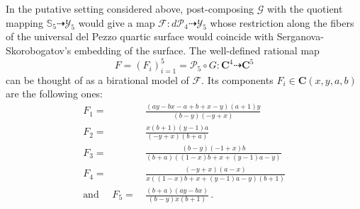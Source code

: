 \documentclass[11pt]{amsart}
\begin{document}
In the putative setting considered above, post-composing %
 $\mathcal G$ with the quotient mapping $\mathbb S_{5}\dashrightarrow \boldsymbol{\mathcal Y}_5$ would give a map 
$\mathcal F : d\mathcal P_4\dashrightarrow \boldsymbol{\mathcal Y}_5 $ whose restriction along the fibers of the universal del Pezzo quartic surface would coincide with Serganova-Skorobogatov's embedding of the surface. The well-defined rational map 
\begin{equation}
\label{Eq:map-F}
F=(F_i)_{i=1}^5= \mathcal P_5\circ G: \mathbf C^4 \dashrightarrow \mathbf C^5
\end{equation}
 can be thought of as a birational model of $\mathcal F$. 
 Its components $F_i\in \mathbf C(x,y,a,b)$ are the following ones: 
\begin{align*}
F_1= &\, 
\frac{\left(a y -b x -a +b +x -y \right) \left(a +1\right) y}{\left(b -y \right) \left(-y +x \right)}
\\
F_2= &\, 
\frac{x \left(b +1\right) \left(y -1\right) a}{\left(-y +x \right) \left(b +a \right)}
\\
F_3= &\, 
\frac{\left(b -y \right) \left(-1+x \right) b}{\left(b +a \right) \left(\left(1-x \right) b +x +\left(y -1\right) a -y \right)}
\\
F_4= &\, 
\frac{\left(-y +x \right) \left(a -x \right)}{x \left(\left(1-x \right) b +x +\left(y -1\right) a -y \right) \left(b +1\right)}
\\
\mbox{and } \quad  F_5= &\, 
\frac{\left(b +a \right) \left(a y -b x \right)}{\left(b -y \right) x \left(b +1\right)}
\, .
\end{align*}
%
%
%
%
\end{document}
